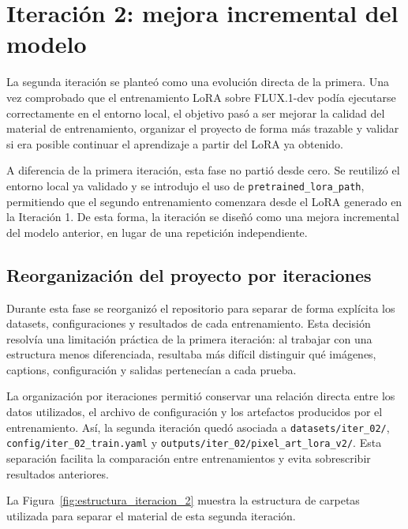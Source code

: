 \documentclass[a4paper,11pt,titlepage]{scrbook}
\begin{document}
\section{Iteración 2: mejora incremental del modelo}
\label{sec:iteracion_2}

La segunda iteración se planteó como una evolución directa de la primera. Una vez comprobado que el entrenamiento LoRA sobre FLUX.1-dev podía ejecutarse correctamente en el entorno local, el objetivo pasó a ser mejorar la calidad del material de entrenamiento, organizar el proyecto de forma más trazable y validar si era posible continuar el aprendizaje a partir del LoRA ya obtenido.

\medskip

A diferencia de la primera iteración, esta fase no partió desde cero. Se reutilizó el entorno local ya validado y se introdujo el uso de \texttt{pretrained\_lora\_path}, permitiendo que el segundo entrenamiento comenzara desde el LoRA generado en la Iteración 1. De esta forma, la iteración se diseñó como una mejora incremental del modelo anterior, en lugar de una repetición independiente.

\subsection{Reorganización del proyecto por iteraciones}
\label{subsec:reorganizacion_iteracion_2}

Durante esta fase se reorganizó el repositorio para separar de forma explícita los datasets, configuraciones y resultados de cada entrenamiento. Esta decisión resolvía una limitación práctica de la primera iteración: al trabajar con una estructura menos diferenciada, resultaba más difícil distinguir qué imágenes, captions, configuración y salidas pertenecían a cada prueba.

\medskip

La organización por iteraciones permitió conservar una relación directa entre los datos utilizados, el archivo de configuración y los artefactos producidos por el entrenamiento. Así, la segunda iteración quedó asociada a \texttt{datasets/iter\_02/}, \texttt{config/iter\_02\_train.yaml} y \texttt{outputs/iter\_02/pixel\_art\_lora\_v2/}. Esta separación facilita la comparación entre entrenamientos y evita sobrescribir resultados anteriores.

La Figura~\ref{fig:estructura_iteracion_2} muestra la estructura de carpetas utilizada para separar el material de esta segunda iteración.
\end{document}
